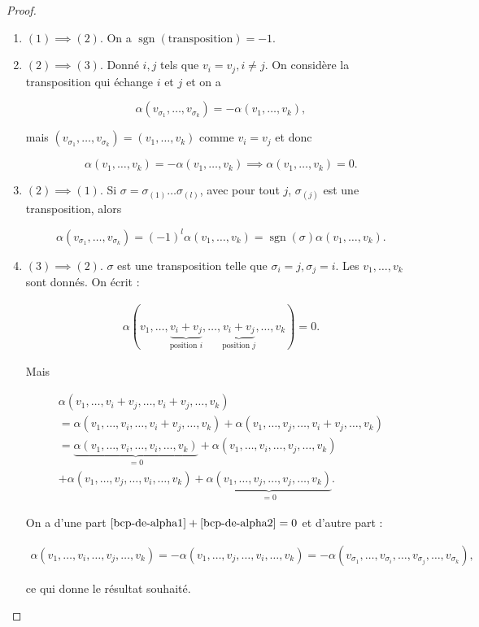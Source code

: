 \documentclass[french]{article}
\theoremstyle{definition}
\begin{document}
\begin{proof}

  \

  \begin{enumerate}
    \item \((1) \implies (2)\). On a \(\operatorname{sgn}(\text{transposition}) = -1\).
    \item \((2) \implies (3)\). Donné \(i,j\) tels que \(v_i = v_j, i \neq j\). On considère la transposition qui échange \(i\) et \(j\) et on a

    \[\alpha(v _{\sigma_1}, \dots, v _{\sigma_k}) = - \alpha(v_1, \dots, v_k), \]

    mais \((v _{\sigma_1}, \dots, v _{\sigma_k}) = (v_1, \dots, v_k)\) comme \(v_i = v_j\) et donc

    \[\alpha(v_1, \dots, v_k) = - \alpha(v_1, \dots, v_k) \implies \alpha(v_1, \dots,v_k) = 0.\]

    \item \((2) \implies (1)\). Si \(\sigma = \sigma _{(1)} \dots \sigma _{(l)}\), avec pour tout \(j\), \(\sigma _{(j)}\) est une transposition, alors

    \[\alpha(v _{\sigma_1}, \dots,v _{\sigma_k}) = (-1) ^{l}\alpha(v_1, \dots, v_k) = \operatorname{sgn}(\sigma)\alpha(v_1, \dots, v_k).\]

    \item \((3) \implies (2)\). \(\sigma\) est une transposition telle que \(\sigma_i = j, \sigma_j = i\). Les \(v_1, \dots, v_k\) sont donnés. On écrit :

    \begin{gather*}
      \alpha(v_1, \dots, \underbrace{v_i+v_j}_{\text{position }i},\dots, \underbrace{v_i+ v_j}_{\text{position }j}, \dots, v_k) = 0.
    \end{gather*}

    Mais

    \begin{gather}
      \alpha(v_1, \dots, v_i + v_j, \dots, v_i + v_j, \dots, v_k) \\
       = \alpha(v_1, \dots, v_i, \dots, v_i+v_j, \dots, v_k) + \alpha(v_1, \dots, v_j, \dots, v_i+v_j, \dots, v_k) \\
      = \underbrace{\alpha(v_1, \dots, v_i, \dots, v_i, \dots, v_k)}_{=0} + \alpha(v_1, \dots, v_i, \dots, v_j, \dots, v_k) \label{bcp-de-alpha1}\\
       + \alpha(v_1, \dots, v_j,\dots, v_i, \dots, v_k) + \underbrace{\alpha(v_1, \dots, v_j, \dots, v_j, \dots, v_k)}_{=0}. \label{bcp-de-alpha2}
    \end{gather}

    On a d'une part \(\ref{bcp-de-alpha1}+ \ref{bcp-de-alpha2} = 0\) et d'autre part :

    \begin{gather*}
      \alpha(v_1, \dots, v_i, \dots, v_j, \dots, v_k) = -\alpha(v_1, \dots, v_j, \dots, v_i, \dots, v_k) = -\alpha({v _{\sigma_1}}, \dots, v _{\sigma_i}, \dots, v _{\sigma_j}, \dots, v _{\sigma_k}),
    \end{gather*}

    ce qui donne le résultat souhaité.
  \end{enumerate}
\end{proof}
\end{document}
